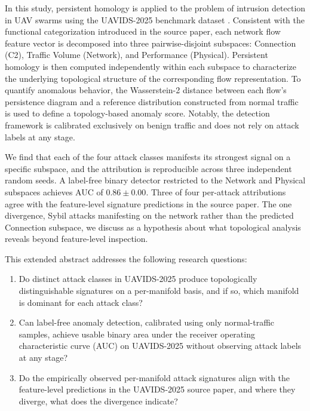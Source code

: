 \documentclass[conf]{new-aiaa}
\begin{document}
In this study, persistent homology is applied to the problem of intrusion detection in UAV swarms using the UAVIDS-2025 benchmark dataset \cite{Zeng}. Consistent with the functional categorization introduced in the source paper, each network flow feature vector is decomposed into three pairwise-disjoint subspaces: Connection (C2), Traffic Volume (Network), and Performance (Physical). Persistent homology is then computed independently within each subspace to characterize the underlying topological structure of the corresponding flow representation. To quantify anomalous behavior, the Wasserstein-2 distance between each flow’s persistence diagram and a reference distribution constructed from normal traffic is used to define a topology-based anomaly score. Notably, the detection framework is calibrated exclusively on benign traffic and does not rely on attack labels at any stage.

We find that each of the four attack classes manifests its strongest signal on a specific subspace, and the attribution is reproducible across three independent random seeds. A label-free binary detector restricted to the Network and Physical subspaces achieves AUC of $0.86 \pm 0.00$. Three of four per-attack attributions agree with the feature-level signature predictions in the source paper. The one divergence, Sybil attacks manifesting on the network rather than the predicted Connection subspace, we discuss as a hypothesis about what topological analysis reveals beyond feature-level inspection.

This extended abstract addresses the following research questions:
\begin{enumerate}
    \item Do distinct attack classes in UAVIDS-2025 produce topologically distinguishable signatures on a per-manifold basis, and if so, which manifold is dominant for each attack class?
    \item Can label-free anomaly detection, calibrated using only normal-traffic samples, achieve usable binary area under the receiver operating characteristic curve (AUC) on UAVIDS-2025 without observing attack labels at any stage?
    \item Do the empirically observed per-manifold attack signatures align with the feature-level predictions in the UAVIDS-2025 source paper, and where they diverge, what does the divergence indicate?
\end{enumerate}
\end{document}

